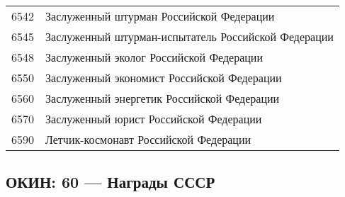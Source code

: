 \documentclass[10pt, a4paper, titlepage]{article}
\begin{document}
\begin{center}
\begin{longtable}{rp{}}
        6542 & Заслуженный штурман Российской Федерации \\
        6545 & Заслуженный штурман-испытатель Российской Федерации \\
        6548 & Заслуженный эколог Российской Федерации \\
        6550 & Заслуженный экономист Российской Федерации \\
        6560 & Заслуженный энергетик Российской Федерации \\
        6570 & Заслуженный юрист Российской Федерации \\
        6590 & Летчик-космонавт Российской Федерации \\
    \end{longtable}
\end{center}

\subsection{ОКИН: 60 --- Награды СССР}
\end{document}

